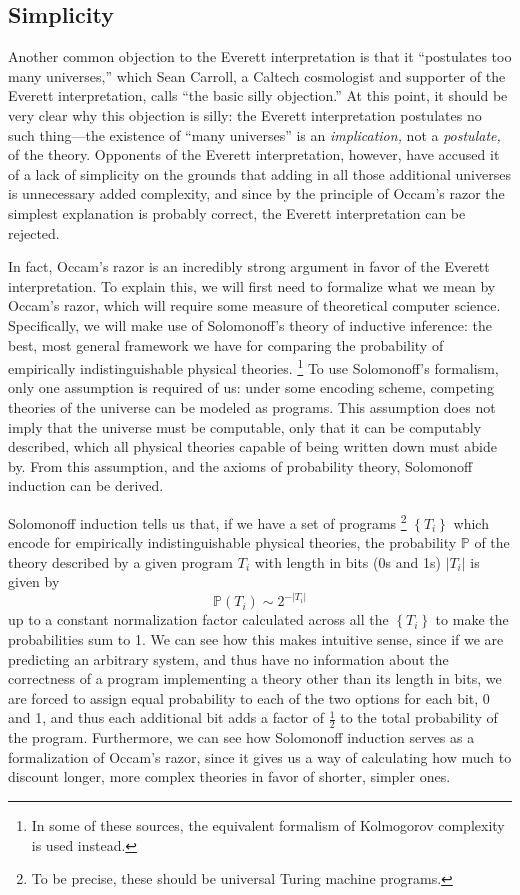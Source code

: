 \documentclass[
    12pt,
    letterpaper,
    aps,
    prd,
    longbibliography,
    twocolumn,
    nofootinbib,
    raggedbottom,
    amsmath,
    amssymb,
    amsfonts,
]{revtex4-1}
\newcommand{\abs}[1]{\left|#1\right|}
\newcommand{\set}[1]{\left\{#1\right\}}
\newcommand{\bbm}[1]{\mathbb{#1}}
\let\origfootnote\footnote
\renewcommand{\footnote}[1]{%
   \begingroup%
   \renewcommand{\footnotesize}{\fontsize{10pt}{8pt}\selectfont}%
   \origfootnote{#1}%
   \endgroup%
}
\begin{document}
\subsection{Simplicity}
\label{sec:simp}

Another common objection to the Everett interpretation is that it ``postulates too many universes,'' which Sean Carroll, a Caltech cosmologist and supporter of the Everett interpretation, calls ``the basic silly objection.''\cite{carroll} At this point, it should be very clear why this objection is silly: the Everett interpretation postulates no such thing---the existence of ``many universes'' is an \textit{implication,} not a \textit{postulate,} of the theory. Opponents of the Everett interpretation, however, have accused it of a lack of simplicity on the grounds that adding in all those additional universes is unnecessary added complexity, and since by the principle of Occam's razor the simplest explanation is probably correct, the Everett interpretation can be rejected.\cite{badoccam}

In fact, Occam's razor is an incredibly strong argument in favor of the Everett interpretation. To explain this, we will first need to formalize what we mean by Occam's razor, which will require some measure of theoretical computer science. Specifically, we will make use of Solomonoff's theory of inductive inference: the best, most general framework we have for comparing the probability of empirically indistinguishable physical theories.\cite{solomonoff}\cite{occam}\cite{lesswrongsolomonoff}\footnote{In some of these sources, the equivalent formalism of Kolmogorov complexity is used instead.} To use Solomonoff's formalism, only one assumption is required of us: under some encoding scheme, competing theories of the universe can be modeled as programs. This assumption does not imply that the universe must be computable, only that it can be computably described, which all physical theories capable of being written down must abide by. From this assumption, and the axioms of probability theory, Solomonoff induction can be derived.\cite{solomonoff}

Solomonoff induction tells us that, if we have a set of programs\footnote{To be precise, these should be universal Turing machine programs.} $\set{T_i}$ which encode for empirically indistinguishable physical theories, the probability $\bbm P$ of the theory described by a given program $T_i$ with length in bits (0s and 1s) $\abs{T_i}$ is given by
\[
    \bbm P(T_i) \sim 2^{-\abs{T_i}}
\]
up to a constant normalization factor calculated across all the $\set{T_i}$ to make the probabilities sum to 1.\cite{solomonoff} We can see how this makes intuitive sense, since if we are predicting an arbitrary system, and thus have no information about the correctness of a program implementing a theory other than its length in bits, we are forced to assign equal probability to each of the two options for each bit, 0 and 1, and thus each additional bit adds a factor of $\frac{1}{2}$ to the total probability of the program. Furthermore, we can see how Solomonoff induction serves as a formalization of Occam's razor, since it gives us a way of calculating how much to discount longer, more complex theories in favor of shorter, simpler ones.
\end{document}
